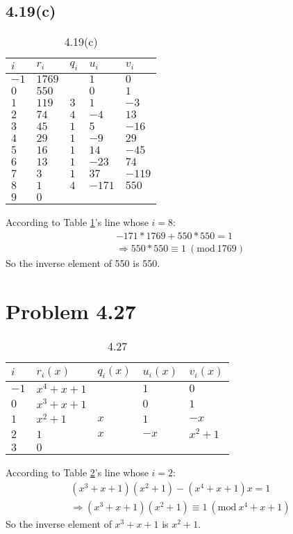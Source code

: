 \documentclass[acmlarge,screen]{acmart}
\begin{document}
\begin{CJK*}{UTF8}{gbsn}
\subsection{4.19(c)}
\begin{table}
  \caption{4.19(c)}
  \label{tab:4.19(c)}
  \begin{tabular}{m{5em} m{5em} m{5em} m{5em} m{5em}}
    \toprule
    $i$&$r_i$&$q_i$&$u_i$&$v_i$\\
    \midrule
    $-1$&$1769$&&$1$&$0$\\
    $0$&$550$&&$0$&$1$\\
	$1$&$119$&$3$&$1$&$-3$\\
	$2$&$74$&$4$&$-4$&$13$\\
	$3$&$45$&$1$&$5$&$-16$\\
	$4$&$29$&$1$&$-9$&$29$\\
	$5$&$16$&$1$&$14$&$-45$\\
	$6$&$13$&$1$&$-23$&$74$\\
	$7$&$3$&$1$&$37$&$-119$\\
	$8$&$1$&$4$&$-171$&$550$\\
	$9$&$0$&&&\\
  \bottomrule
\end{tabular}
\end{table}
According to Table \ref{tab:4.19(c)}'s line whose $i=8$:
\begin{align*}
	-171*1769+550*550=1\\
	\Rightarrow550*550\equiv1\ (\text{mod}\ 1769)
\end{align*}
So the inverse element of 550 is 550.
\section{Problem 4.27}
\begin{table}
  \caption{4.27}
  \label{tab:4.27}
  \begin{tabular}{m{5em} m{5em} m{5em} m{5em} m{5em}}
    \toprule
    $i$&$r_i(x)$&$q_i(x)$&$u_i(x)$&$v_i(x)$\\
    \midrule
    $-1$&$x^4+x+1$&&$1$&$0$\\
    $0$&$x^3+x+1$&&$0$&$1$\\
	$1$&$x^2+1$&$x$&$1$&$-x$\\
	$2$&$1$&$x$&$-x$&$x^2+1$\\
	$3$&$0$&&&\\
  \bottomrule
\end{tabular}
\end{table}
According to Table \ref{tab:4.27}'s line whose $i=2$:
\begin{align*}
	(x^3+x+1)(x^2+1)-(x^4+x+1)x=1\\
	\Rightarrow(x^3+x+1)(x^2+1)\equiv1\ (\text{mod}\ x^4+x+1)
\end{align*}
So the inverse element of $x^3+x+1$ is $x^2+1$.

\end{CJK*}
\end{document}

